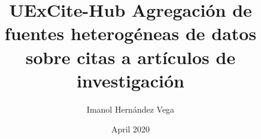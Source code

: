 \documentclass[12pt,a4paper,twoside]{report}
\begin{document}
  \title{UExCite-Hub Agregación de fuentes heterogéneas de datos sobre citas a artículos de investigación}
  \author{Imanol Hernández Vega}
  \date{April 2020}

  \sloppy
  \pagebreak

  
  \thispagestyle{empty}
  \newpage
  \thispagestyle{empty}

  \setcounter{page}{1}
  \tableofcontents
  \newpage

  \listoftables
  \newpage

  \listoffigures
  \newpage

  

  \pagestyle{fancy}
  \setcounter{page}{1}
  

  

  
\end{document}
